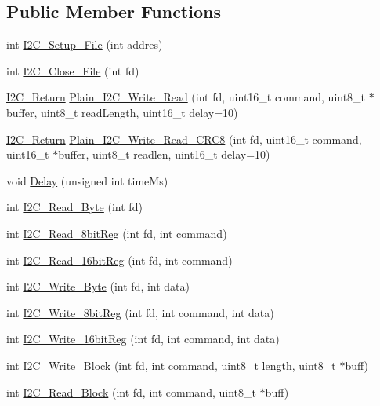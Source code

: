 \subsection*{Public Member Functions}
\begin{DoxyCompactItemize}
\item 
int \hyperlink{classI2CDriver_ae25c889f0a2540eee34d53e0228fe914}{I2\+C\+\_\+\+Setup\+\_\+\+File} (int addres)
\item 
int \hyperlink{classI2CDriver_a6480a0e3e5022ac90944f319ca5a5f4e}{I2\+C\+\_\+\+Close\+\_\+\+File} (int fd)
\item 
\hyperlink{I2CDriver_8h_a52c38e7692a76e897b00daa867b29d3f}{I2\+C\+\_\+\+Return} \hyperlink{classI2CDriver_a1e025ccfccece30b7d42acd1bf7e8e41}{Plain\+\_\+\+I2\+C\+\_\+\+Write\+\_\+\+Read} (int fd, uint16\+\_\+t command, uint8\+\_\+t $\ast$buffer, uint8\+\_\+t read\+Length, uint16\+\_\+t delay=10)
\item 
\hyperlink{I2CDriver_8h_a52c38e7692a76e897b00daa867b29d3f}{I2\+C\+\_\+\+Return} \hyperlink{classI2CDriver_a732c5b799a0aecde0d908ee981872572}{Plain\+\_\+\+I2\+C\+\_\+\+Write\+\_\+\+Read\+\_\+\+C\+R\+C8} (int fd, uint16\+\_\+t command, uint16\+\_\+t $\ast$buffer, uint8\+\_\+t readlen, uint16\+\_\+t delay=10)
\item 
void \hyperlink{classI2CDriver_a01453a7adeb358f269faabb33953eee0}{Delay} (unsigned int time\+Ms)
\item 
int \hyperlink{classI2CDriver_acd90c5e9215accc2baf66757054e2906}{I2\+C\+\_\+\+Read\+\_\+\+Byte} (int fd)
\item 
int \hyperlink{classI2CDriver_aab652313af52fe19360bc928baf80fae}{I2\+C\+\_\+\+Read\+\_\+8bit\+Reg} (int fd, int command)
\item 
int \hyperlink{classI2CDriver_a8639cbc95b98be425f6b30dd591384c6}{I2\+C\+\_\+\+Read\+\_\+16bit\+Reg} (int fd, int command)
\item 
int \hyperlink{classI2CDriver_a7b5eb92afa9ed0b5af264836d0944520}{I2\+C\+\_\+\+Write\+\_\+\+Byte} (int fd, int data)
\item 
int \hyperlink{classI2CDriver_a6ff7dfdd4aca26c83c6047f45cce1a9e}{I2\+C\+\_\+\+Write\+\_\+8bit\+Reg} (int fd, int command, int data)
\item 
int \hyperlink{classI2CDriver_a445d2ef0ba5f742fb8264c202dae4a8d}{I2\+C\+\_\+\+Write\+\_\+16bit\+Reg} (int fd, int command, int data)
\item 
int \hyperlink{classI2CDriver_a389bf23234176e0fd0421e078e1fa00d}{I2\+C\+\_\+\+Write\+\_\+\+Block} (int fd, int command, uint8\+\_\+t length, uint8\+\_\+t $\ast$buff)
\item 
int \hyperlink{classI2CDriver_a3877a689d16c30835569c7fa5f064359}{I2\+C\+\_\+\+Read\+\_\+\+Block} (int fd, int command, uint8\+\_\+t $\ast$buff)
\end{DoxyCompactItemize}


